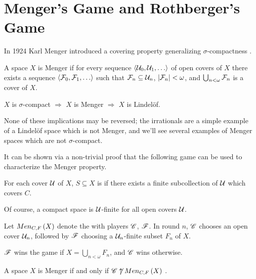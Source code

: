 
\chapter{Menger's Game and Rothberger's Game}

In 1924 Karl Menger introduced a covering property generalizing
$\sigma$-compactness \cite{custom31879423}.

\begin{defn}
  A space $X$ is Menger if for every sequence $\<\mc U_0,\mc U_1,\dots\>$
  of open covers of $X$ there exists a sequence
  $\<\mc F_0,\mc F_1,\dots\>$ such that $\mathcal{F}_n\subseteq \mathcal{U}_n$,
  $|\mathcal{F}_n|<\omega$, and $\bigcup_{n<\omega}\mathcal{F}_n$ is a cover of $X$.
\end{defn}

\begin{prop}
  $X$ is $\sigma$-compact
    $\Rightarrow$
  $X$ is Menger
    $\Rightarrow$
  $X$ is Lindel\"of.
\end{prop}

None of these implications may be reversed; the irrationals are a simple example
of a Lindel\"of space which is not Menger, and we'll see several examples of
Menger spaces which are not $\sigma$-compact.

It can be shown via a non-trivial
proof that the following game can be used to characterize the Menger property.

\begin{defn}
  For each cover $\mathcal{U}$ of $X$, $S\subseteq X$ is  if
  there exists a finite subcollection of $\mathcal{U}$ which covers $C$.
\end{defn}

Of course, a compact space is $\mathcal{U}$-finite for all open covers $\mathcal{U}$.

\begin{game}
  Let $Men_{C,F}\left({X}\right)$ denote the  with players $\mathscr{C}$, $\mathscr{F}$.
  In round $n$, $\mathscr{C}$ chooses an open cover $\mathcal{U}_n$, followed by $\mathscr{F}$
  choosing a $\mathcal{U}_n$-finite subset $F_n$ of $X$.

  $\mathscr{F}$ wins the game if $X = \bigcup_{n<\omega}F_n$,
  and $\mathscr{C}$ wins otherwise.
\end{game}

\begin{thm}
  A space $X$ is Menger if and only if $\mathscr{C}\not\uparrow Men_{C,F}\left({X}\right)$
  \cite{MR1544773}.
\end{thm}

